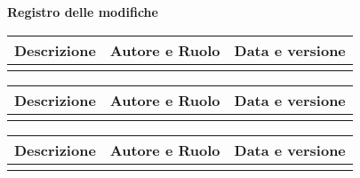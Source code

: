 \newpage

\begin{center}
	\Large{\textbf{Registro delle modifiche}}
	\\\vspace{0.5cm}
	\normalsize
	\begin{tabularx}{\textwidth}{Xcc}
		\textbf{Descrizione} & \textbf{Autore e Ruolo} & \textbf{Data e versione} \\\toprule
		\modificheuno
		\bottomrule
	\end{tabularx}
	\newpage
	\begin{tabularx}{\textwidth}{Xcc}
		\textbf{Descrizione} & \textbf{Autore e Ruolo} & \textbf{Data e versione} \\\toprule
		\modifichedue
		\bottomrule
	\end{tabularx}
	\newpage
	\begin{tabularx}{\textwidth}{Xcc}
		\textbf{Descrizione} & \textbf{Autore e Ruolo} & \textbf{Data e versione} \\\toprule
		\modifichetre
		\bottomrule
	\end{tabularx}
\end{center}
\newpage